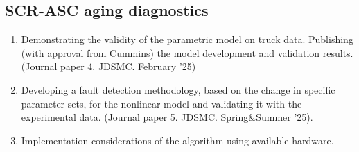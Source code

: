 \subsection{SCR-ASC aging diagnostics}
\begin{enumerate}
        \item Demonstrating the validity of the parametric model on truck data. Publishing (with approval from Cummins) the model development and validation results. (Journal paper 4. JDSMC. February '25)
        \item Developing a fault detection methodology, based on the change in specific parameter sets, for the nonlinear model and validating it with the experimental data. (Journal paper 5. JDSMC. Spring$\&$Summer '25).
        \item Implementation considerations of the algorithm using available hardware.
\end{enumerate}
